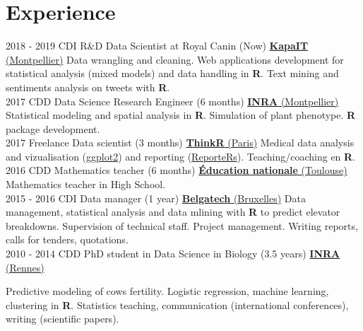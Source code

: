 \documentclass[letterpaper]{twentysecondcv} %
\begin{document}
\makeprofile %


\section{Experience}

\begin{twenty} %
\twentyitem
    	{2018 - 2019}
		{CDI}
        {R\&D Data Scientist at Royal Canin \textnormal{(Now)}}
        {\href{http://www.kapa-it.fr/}{\textbf{KapaIT} (Montpellier)}}
        {}
        {
        Data wrangling and cleaning. Web applications development for statistical analysis (mixed models) and data handling in \textbf{R}. Text mining and sentiments analysis on tweets with \textbf{R}.
        }
        \\
\twentyitem
    	{2017}
		{CDD}
        {Data Science Research Engineer \textnormal{(6 months)}}
        {\href{https://www6.montpellier.inra.fr/mistea/}{\textbf{INRA} (Montpellier)}}
        {}
        {
        Statistical modeling and spatial analysis in \textbf{R}. 
        Simulation of plant phenotype. \textbf{R} package development.
        }
        \\
	\twentyitem
    	{2017}
		{Freelance}
        {Data scientist \textnormal{(3 months)}}
        {\href{https://thinkr.fr/}{\textbf{ThinkR} (Paris)}}
        {}
        {
        {
        Medical data analysis and vizualisation (\href{https://ggplot2.tidyverse.org/}{ggplot2}) and reporting
        (\href{https://davidgohel.github.io/ReporteRs/}{ReporteRs}). Teaching/coaching en \textbf{R}.
        }
        }
    \\   
    \twentyitem
   		{2016}
		{CDD}
        {Mathematics teacher \textnormal{(6 months)}}
        {\href{http://www.ac-toulouse.fr/}{\textbf{Éducation nationale} (Toulouse)}}
        {}
        {
        Mathematics teacher in High School.
        }
     \\
     \twentyitem
   		{2015 - 2016}
		{CDI}
        {Data manager \textnormal{(1 year)}}
        {\href{https://www.belgatech-engineering.com/}{\textbf{Belgatech} (Bruxelles)}}
        {}
        {
        Data management, statistical analysis and data mlining with \textbf{R} to predict elevator breakdowns. 
        Supervision of technical staff. Project management. Writing reports, calls for tenders, quotations.
    	}
    	    \\   
    \twentyitem
   		{2010 - 2014}
		{CDD}
        {PhD student in Data Science in Biology \textnormal{(3.5 years)}}
        {\href{https://www6.rennes.inra.fr/pegase}{\textbf{INRA} (Rennes)}}
        {}
        {Predictive modeling of cows fertility. Logistic regression, machine learning, clustering in \textbf{R}. Statistics teaching, communication (international conferences), writing (scientific papers).
    
}
\end{twenty}
\end{document}
